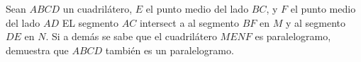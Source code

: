 Sean $ABCD$ un cuadrilátero, $E$ el punto medio del lado $BC$, y $F$ el punto medio del lado $AD$ EL segmento $AC$ intersect a al segmento $BF$ en $M$ y al segmento $DE$ en $N$. Si a demás se sabe que el cuadrilátero $MENF$ es paralelogramo, demuestra que $ABCD$ también es un paralelogramo.